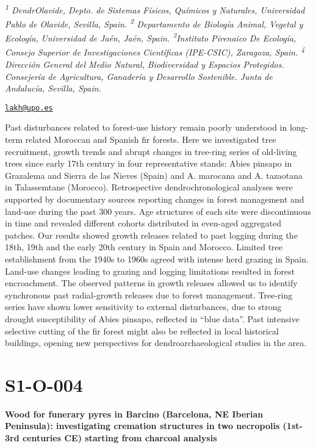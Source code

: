 \documentclass[
]{book}
\begin{document}
\emph{\textsuperscript{1} DendrOlavide, Depto. de Sistemas Físicos, Químicos y Naturales, Universidad Pablo de Olavide, Sevilla, Spain. \textsuperscript{2} Departamento de Biología Animal, Vegetal y Ecología, Universidad de Jaén, Jaén, Spain. \textsuperscript{3}Instituto Pirenaico De Ecología, Consejo Superior de Investigaciones Científicas (IPE-CSIC), Zaragoza, Spain. \textsuperscript{4} Dirección General del Medio Natural, Biodiversidad y Espacios Protegidos. Consejería de Agricultura, Ganadería y Desarrollo Sostenible. Junta de Andalucía, Sevilla, Spain.}

\href{mailto:lakh@upo.es}{\nolinkurl{lakh@upo.es}}

Past disturbances related to forest-use history remain poorly understood in long-term related Moroccan and Spanish fir forests. Here we investigated tree recruitment, growth trends and abrupt changes in tree-ring series of old-living trees since early 17th century in four representative stands: Abies pinsapo in Grazalema and Sierra de las Nieves (Spain) and A. marocana and A. tazaotana in Talassemtane (Morocco). Retrospective dendrochronological analyses were supported by documentary sources reporting changes in forest management and land-use during the past 300 years. Age structures of each site were discontinuous in time and revealed different cohorts distributed in even-aged aggregated patches. Our results showed growth releases related to past logging during the 18th, 19th and the early 20th century in Spain and Morocco. Limited tree establishment from the 1940s to 1960s agreed with intense herd grazing in Spain. Land-use changes leading to grazing and logging limitations resulted in forest encroachment. The observed patterns in growth releases allowed us to identify synchronous past radial-growth releases due to forest management. Tree-ring series have shown lower sensitivity to external disturbances, due to strong drought susceptibility of Abies pinsapo, reflected in ``blue data''. Past intensive selective cutting of the fir forest might also be reflected in local historical buildings, opening new perspectives for dendroarchaeological studies in the area.

\hypertarget{s1-o-004}{%
\section*{S1-O-004}\label{s1-o-004}}

\textbf{Wood for funerary pyres in Barcino (Barcelona, NE Iberian Peninsula): investigating cremation structures in two necropolis (1st-3rd centuries CE) starting from charcoal analysis}
\end{document}
